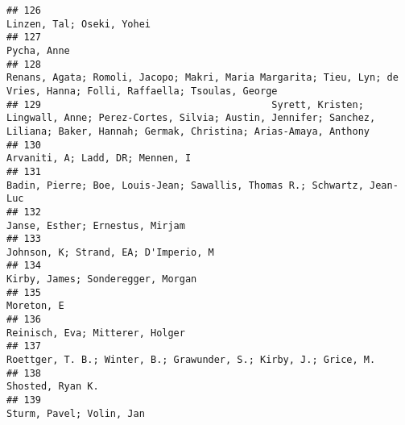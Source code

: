 \documentclass[
  english,
  man]{apa6}
\begin{document}
\begin{verbatim}
## 126                                                                                                                                                                Linzen, Tal; Oseki, Yohei
## 127                                                                                                                                                                              Pycha, Anne
## 128                                                                     Renans, Agata; Romoli, Jacopo; Makri, Maria Margarita; Tieu, Lyn; de Vries, Hanna; Folli, Raffaella; Tsoulas, George
## 129                                        Syrett, Kristen; Lingwall, Anne; Perez-Cortes, Silvia; Austin, Jennifer; Sanchez, Liliana; Baker, Hannah; Germak, Christina; Arias-Amaya, Anthony
## 130                                                                                                                                                         Arvaniti, A; Ladd, DR; Mennen, I
## 131                                                                                                                  Badin, Pierre; Boe, Louis-Jean; Sawallis, Thomas R.; Schwartz, Jean-Luc
## 132                                                                                                                                                          Janse, Esther; Ernestus, Mirjam
## 133                                                                                                                                                     Johnson, K; Strand, EA; D'Imperio, M
## 134                                                                                                                                                        Kirby, James; Sonderegger, Morgan
## 135                                                                                                                                                                               Moreton, E
## 136                                                                                                                                                          Reinisch, Eva; Mitterer, Holger
## 137                                                                                                                         Roettger, T. B.; Winter, B.; Grawunder, S.; Kirby, J.; Grice, M.
## 138                                                                                                                                                                         Shosted, Ryan K.
## 139                                                                                                                                                                 Sturm, Pavel; Volin, Jan

\end{verbatim}
\end{document}
